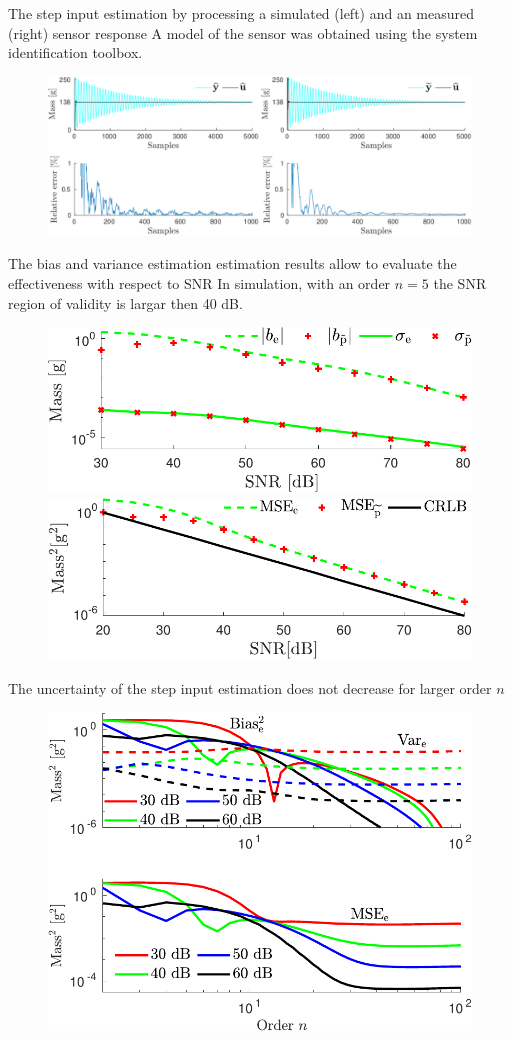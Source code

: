 \documentclass[presentation]{beamer}
\begin{document}
\begin{frame}[label={slide:experimental-validation2}]{The step input estimation by processing a simulated (left) and an measured (right) sensor response}
A model of the sensor was obtained using the system identification toolbox.
\begin{figure}[htb!]
\centering
\includegraphics[width=1\columnwidth]{./fig/Exp_Fig_1.pdf} 
\end{figure}
\end{frame}

\begin{frame}[label={slide:experimental-validation3}]{The bias and variance estimation estimation results allow to evaluate the effectiveness with respect to SNR}
In simulation, with an order $n=5$ the SNR region of validity is largar then 40 dB. 
\begin{figure}[htb!]
\centering
\includegraphics[width=0.55\columnwidth]{./fig/Exp_Fig_2.pdf} 
\includegraphics[width=0.55\columnwidth]{./fig/Exp_Fig_3.pdf} 
\end{figure}
\end{frame}

\begin{frame}[label={slide:experimental-validation4}]{The uncertainty of the step input estimation does not decrease for larger order $n$}
\begin{figure}[htb!]
\centering
\includegraphics[width=0.55\columnwidth]{./fig/Exp_Fig_4.pdf} 
\end{figure}
\end{frame}
\end{document}
